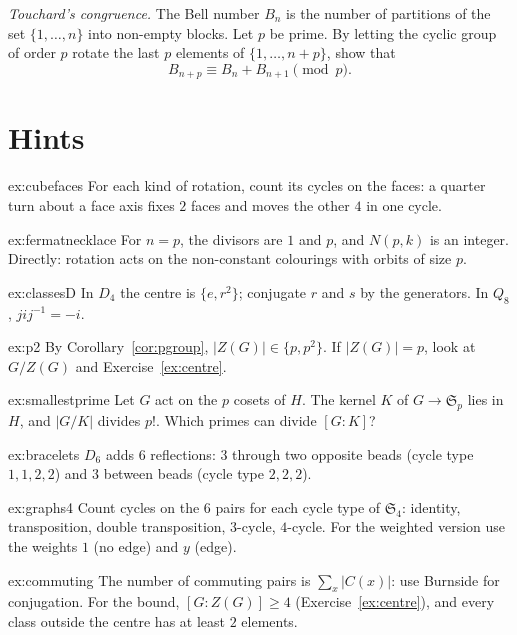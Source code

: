 \begin{exercise}[$\star\star$]\label{pb:touchard}
\emph{Touchard's congruence.} The Bell number $B_n$ is the number of partitions of the set $\{1,\dots,n\}$ into non-empty blocks.
Let $p$ be prime. By letting the cyclic group of order $p$ rotate the last $p$ elements of $\{1,\dots,n+p\}$, show that
\[
B_{n+p}\equiv B_n+B_{n+1}\pmod p.
\]
\end{exercise}

\section{Hints}

\begin{hint}{ex:cubefaces}
For each kind of rotation, count its cycles on the faces: a quarter turn about a face axis fixes $2$ faces and moves the other $4$ in one cycle.
\end{hint}
\begin{hint}{ex:fermatnecklace}
For $n=p$, the divisors are $1$ and $p$, and $N(p,k)$ is an integer. Directly: rotation acts on the non-constant colourings with orbits of size $p$.
\end{hint}
\begin{hint}{ex:classesD}
In $D_4$ the centre is $\{e,r^2\}$; conjugate $r$ and $s$ by the generators. In $Q_8$, $jij^{-1}=-i$.
\end{hint}
\begin{hint}{ex:p2}
By Corollary~\ref{cor:pgroup}, $|Z(G)|\in\{p,p^2\}$. If $|Z(G)|=p$, look at $G/Z(G)$ and Exercise~\ref{ex:centre}.
\end{hint}
\begin{hint}{ex:smallestprime}
Let $G$ act on the $p$ cosets of $H$. The kernel $K$ of $G\to\mathfrak S_p$ lies in $H$, and $|G/K|$ divides $p!$. Which primes can divide $[G:K]$?
\end{hint}
\begin{hint}{ex:bracelets}
$D_6$ adds $6$ reflections: $3$ through two opposite beads (cycle type $1,1,2,2$) and $3$ between beads (cycle type $2,2,2$).
\end{hint}
\begin{hint}{ex:graphs4}
Count cycles on the $6$ pairs for each cycle type of $\mathfrak S_4$: identity, transposition, double transposition, $3$-cycle, $4$-cycle. For the weighted version use the weights $1$ (no edge) and $y$ (edge).
\end{hint}
\begin{hint}{ex:commuting}
The number of commuting pairs is $\sum_x|C(x)|$: use Burnside for conjugation. For the bound, $[G:Z(G)]\ge4$ (Exercise~\ref{ex:centre}), and every class outside the centre has at least $2$ elements.
\end{hint}

